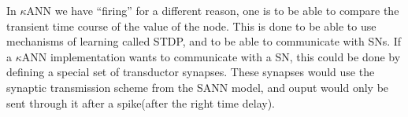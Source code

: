 In $\kappa$ANN we have ``firing'' for a different reason, one is to be able to compare the transient time course of the value of the node.
This is done to be able to use mechanisms of learning called STDP, and to be able to communicate with SNs.
If a $\kappa$ANN implementation wants to communicate with a SN, this could be done by defining a special set of transductor synapses.
These synapses would use the synaptic transmission scheme from the SANN model, and ouput would only be sent through it after a spike(after the right time delay).


